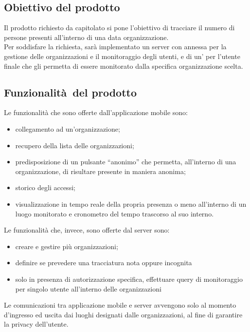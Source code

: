 \documentclass[../analisi-dei-requisiti]{subfiles}
\begin{document}
\subsection{Obiettivo del prodotto}
\label{sub:obiettivo_del_prodotto}
Il prodotto richiesto da capitolato si pone l'obiettivo di tracciare il numero di persone presenti all’interno di una data organizzazione.\\
Per soddisfare la richiesta, sarà implementato un server con annessa  per la gestione delle organizzazioni e il monitoraggio degli utenti, e 
di un' per l'utente finale che gli permetta di essere monitorato dalla specifica organizzazione scelta.

\subsection{Funzionalità del prodotto}
\label{sub:funzionalita_del_prodotto}
Le funzionalità che sono offerte dall'applicazione mobile sono:
\begin{itemize}
  \item collegamento ad un’organizzazione;
  \item recupero della lista delle organizzazioni;
  \item predisposizione di un pulsante “anonimo” che permetta, all’interno di una organizzazione, di risultare presente in maniera anonima;
  \item storico degli accessi;
  \item visualizzazione in tempo reale della propria presenza o meno all’interno di un luogo monitorato e cronometro del tempo trascorso al suo interno.
\end{itemize}

Le funzionalità che, invece, sono offerte dal server sono:
\begin{itemize}
  \item creare e gestire più organizzazioni;
  \item definire se prevedere una tracciatura nota oppure incognita
  \item solo in presenza di autorizzazione specifica, effettuare query di monitoraggio per singolo utente all’interno delle organizzazioni
\end{itemize}
Le comunicazioni tra applicazione mobile e server avvengono solo al momento d'ingresso ed uscita dai luoghi designati dalle organizzazioni, al fine di garantire
la privacy dell'utente.
\end{document}
